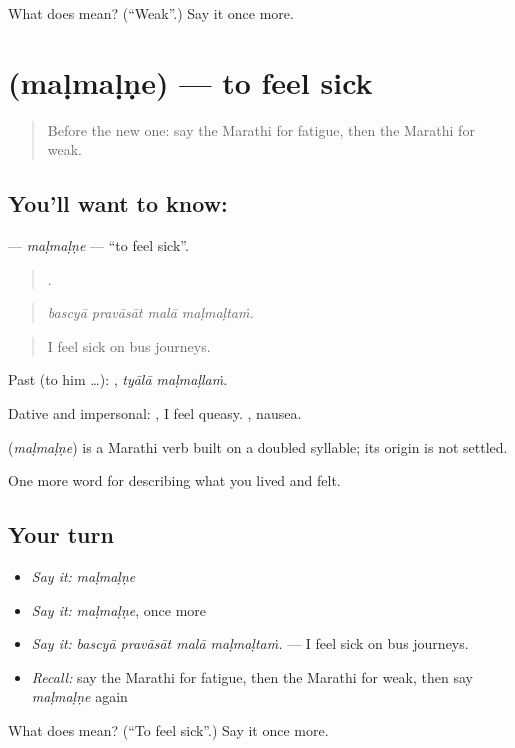 \begin{tcolorbox}[breakable,colback=teal!4,colframe=teal!35!black,title={Before you move on}]
What does  mean? (\textquotedblleft{}Weak\textquotedblright{}.) Say it once more.
\end{tcolorbox}
\section[\texorpdfstring{\mr{मळमळणे} (maḷmaḷṇe)}{मळमळणे (maḷmaḷṇe)}]{ (maḷmaḷṇe) — to feel sick}

\label{lesson:MR-C480-malmalne}



\begin{quote}
Before the new one: say the Marathi for fatigue, then the Marathi for weak.
\end{quote}

\subsection*{You'll want to know: }
\textbf{} — \emph{maḷmaḷṇe} — \textquotedblleft{}to feel sick\textquotedblright{}.

\begin{quote}
   .
\end{quote}

\begin{quote}
\emph{bascyā pravāsāt malā maḷmaḷtaṁ.}
\end{quote}

\begin{quote}
I feel sick on bus journeys.
\end{quote}

Past (to him …):  , \emph{tyālā maḷmaḷlaṁ}.

Dative and impersonal:  , I feel queasy. , nausea.

\begin{cousinweb}
\textbf{} (\emph{maḷmaḷṇe}) is a Marathi verb built on a doubled syllable; its origin is not settled.
\end{cousinweb}

\begin{grammarlens}[title={What you've built}]
One more word for describing what you lived and felt.
\end{grammarlens}

\subsection*{Your turn}
\begin{itemize}
\raggedright
  \item \emph{Say it:} \emph{maḷmaḷṇe}
  \item \emph{Say it:} \emph{maḷmaḷṇe}, once more
  \item \emph{Say it:} \emph{bascyā pravāsāt malā maḷmaḷtaṁ.} — I feel sick on bus journeys.
  \item \emph{Recall:} say the Marathi for fatigue, then the Marathi for weak, then say \emph{maḷmaḷṇe} again
\end{itemize}

\begin{tcolorbox}[breakable,colback=teal!4,colframe=teal!35!black,title={Before you move on}]
What does  mean? (\textquotedblleft{}To feel sick\textquotedblright{}.) Say it once more.
\end{tcolorbox}
